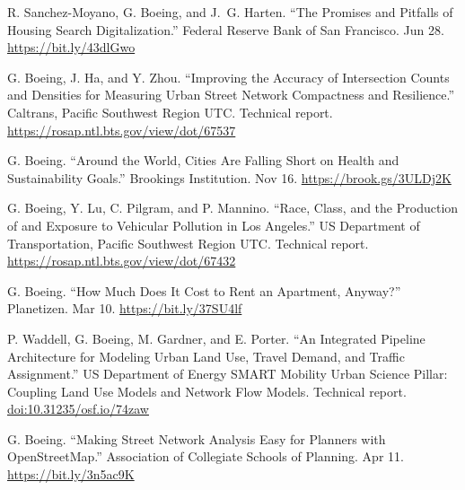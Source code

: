 \documentclass[11pt,a4paper]{report} %
\begin{document}
\begin{tablist}

\item[2023] \tab{}R. Sanchez-Moyano, G. Boeing, and J.~G. Harten. \enquote{The Promises and Pitfalls of Housing Search Digitalization.} Federal Reserve Bank of San Francisco. Jun 28. \href{https://bit.ly/43dlGwo}{https://bit.ly/43dlGwo}

\item[2023] \tab{}G. Boeing, J. Ha, and Y. Zhou. \enquote{Improving the Accuracy of Intersection Counts and Densities for Measuring Urban Street Network Compactness and Resilience.} Caltrans, Pacific Southwest Region UTC\@. Technical report. \href{https://rosap.ntl.bts.gov/view/dot/67537}{https://rosap.ntl.bts.gov/view/dot/67537}

\item[2022] \tab{}G. Boeing. \enquote{Around the World, Cities Are Falling Short on Health and Sustainability Goals.} Brookings Institution. Nov 16. \href{https://brook.gs/3ULDj2K}{https://brook.gs/3ULDj2K}

\item[2021] \tab{}G. Boeing, Y. Lu, C. Pilgram, and P. Mannino. \enquote{Race, Class, and the Production of and Exposure to Vehicular Pollution in Los Angeles.} US Department of Transportation, Pacific Southwest Region UTC\@. Technical report. \href{https://rosap.ntl.bts.gov/view/dot/67432}{https://rosap.ntl.bts.gov/view/dot/67432}

\item[2020] \tab{}G. Boeing. \enquote{How Much Does It Cost to Rent an Apartment, Anyway?} Planetizen. Mar 10. \href{https://bit.ly/37SU4lf}{https://bit.ly/37SU4lf}

\item[2018] \tab{}P. Waddell, G. Boeing, M. Gardner, and E. Porter. \enquote{An Integrated Pipeline Architecture for Modeling Urban Land Use, Travel Demand, and Traffic Assignment.} US Department of Energy SMART Mobility Urban Science Pillar: Coupling Land Use Models and Network Flow Models. Technical report. \href{https://doi.org/10.31235/osf.io/74zaw}{doi:10.31235/osf.io/74zaw}

\item[2017] \tab{}G. Boeing. \enquote{Making Street Network Analysis Easy for Planners with OpenStreetMap.} Association of Collegiate Schools of Planning. Apr 11. \href{https://bit.ly/3n5ac9K}{https://bit.ly/3n5ac9K}

\end{tablist}
\end{document}
